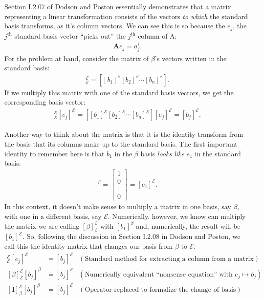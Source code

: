 \documentclass[11pt]{article}
\begin{document}
Section I.2.07 of Dodson and Poston essentially demonstrates that a
matrix representing a linear transformation consists of the vectors
\emph{to which} the standard basis transforms, as it's column
vectors.   We can see this is so because the $e_j$, the
$j^{\text{th}}$ standard basis vector ``picks out'' the
$j^{\text{th}}$ column of A:
\begin{align*}
  \textbf{A}e_j = a^i_j.
\end{align*}
For the problem at hand, consider the matrix of $\beta$'s vectors
written in the standard basis:
\begin{align*}
  [\beta]^\mathcal{E}_\mathcal{E} = \left[[b_1]^\mathcal{E}
    [b_2]^\mathcal{E} \cdots [b_n]^\mathcal{E}\right].
\end{align*}
If we multiply this matrix with one of the standard basis vectors, we
get the corresponding basis vector:
\begin{align*}
  [\beta]^\mathcal{E}_\mathcal{E} [e_j]^\mathcal{E} =
  \left[[b_1]^\mathcal{E} [b_2]^\mathcal{E} \cdots [b_n]^\mathcal{E}\right]
  [e_j]^\mathcal{E} = 
  [b_j]^\mathcal{E}.
\end{align*}

Another way to think about the matrix is that it is the identity
transform from the basis that its columns make up to the standard
basis.  The first important identity to remember here is that $b_1$ in
the $\beta$ basis \emph{looks like} $e_1$ in the standard basis:
\begin{align*}
  [b_1]^\beta = \left[
    \begin{matrix}
      1 \\ 0 \\ \vdots \\ 0
    \end{matrix}
    \right] = [e_1]^\mathcal{E}.
\end{align*}
In this context, it doesn't make sense to multiply a matrix in one
basis, say $\beta$, with one in a different basis, say $\mathcal{E}$.
Numerically, however, we know can multiply the matrix we are calling
$[\beta]^\mathcal{E}_\mathcal{E}$ with $[b_1]^\beta$ and, numerically,
the result will be $[b_1]^\mathcal{E}$.  So, following the discussion
in Section I.2.08 in Dodson and Poston, we call this the identity
matrix that changes our basis from $\beta$ to $\mathcal{E}$:
\begin{align*}
  [\beta]^\mathcal{E}_\mathcal{E} [e_j]^\mathcal{E} &=  [b_j]^\mathcal{E} &
  (\text{Standard method for extracting a column from a matrix})\\
  [\beta]^\mathcal{E}_\mathcal{E} [b_j]^\beta &=  [b_j]^\mathcal{E} &
  (\text{Numerically equivalent ``nonsense equation'' with $e_j \mapsto b_j$})\\
  [\textbf{I}]^\mathcal{E}_\beta [b_j]^\beta &=  [b_j]^\mathcal{E} &
  (\text{Operator replaced to formalize the change of basis})
\end{align*}
\end{document}
